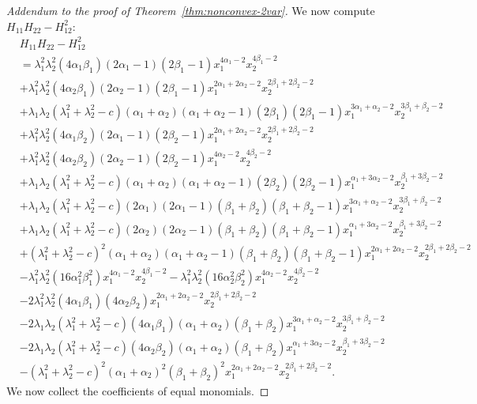 \documentclass[12pt]{elsarticle}
\theoremstyle{definition}
\begin{document}
\begin{proof}[Addendum to the proof of Theorem~\ref{thm:nonconvex-2var}]
We now compute $H_{11}H_{22} - H_{12}^2$:
\[
\begin{aligned}
   & H_{11}H_{22} - H_{12}^2  \\& =\lambda_1^2\lambda_2^2 (4\alpha_1\beta_1)(2\alpha_1 - 1)(2\beta_1 - 1)x_1^{4\alpha_1 - 2}x_2^{4\beta_1 - 2} \\
    & + \lambda_1^2\lambda_2^2 (4\alpha_2\beta_1)(2\alpha_2 - 1)(2\beta_1 - 1)x_1^{2\alpha_1 + 2\alpha_2 - 2}x_2^{2\beta_1 + 2\beta_2 - 2} \\
    & + \lambda_1\lambda_2(\lambda_1^2 + \lambda_2^2 - c)(\alpha_1 + \alpha_2)(\alpha_1 + \alpha_2 -1)(2\beta_1)(2\beta_1 - 1)x_1^{3\alpha_1 + \alpha_2 - 2}x_2^{3\beta_1 + \beta_2 - 2} \\
    & + \lambda_1^2\lambda_2^2 (4\alpha_1\beta_2)(2\alpha_1 - 1)(2\beta_2 - 1)x_1^{2\alpha_1 + 2\alpha_2 - 2}x_2^{2\beta_1 + 2\beta_2 - 2} \\
    & + \lambda_1^2\lambda_2^2 (4\alpha_2\beta_2)(2\alpha_2 - 1)(2\beta_2 - 1)x_1^{4\alpha_2 - 2}x_2^{4\beta_2 - 2} \\
    & + \lambda_1\lambda_2(\lambda_1^2 + \lambda_2^2 - c)(\alpha_1 + \alpha_2)(\alpha_1 + \alpha_2 -1)(2\beta_2)(2\beta_2 - 1)x_1^{\alpha_1 + 3\alpha_2 - 2}x_2^{\beta_1 + 3\beta_2 - 2} \\
    & + \lambda_1\lambda_2(\lambda_1^2 + \lambda_2^2 - c)(2\alpha_1)(2\alpha_1 - 1)(\beta_1 + \beta_2)(\beta_1 + \beta_2 - 1)x_1^{3\alpha_1 + \alpha_2 -2}x_2^{3\beta_1 + \beta_2 -2}\\
    & + \lambda_1\lambda_2(\lambda_1^2 + \lambda_2^2 - c)(2\alpha_2)(2\alpha_2 - 1)(\beta_1 + \beta_2)(\beta_1 + \beta_2 - 1)x_1^{\alpha_1 + 3\alpha_2 -2}x_2^{\beta_1 + 3\beta_2 -2}\\
    & + (\lambda_1^2 + \lambda_2^2 - c)^2 (\alpha_1 + \alpha_2)(\alpha_1 + \alpha_2 -1)(\beta_1 + \beta_2)(\beta_1 + \beta_2 - 1)x_1^{2\alpha_1 + 2\alpha_2 -2}x_2^{2\beta_1 + 2\beta_2 -2}\\
    & -\lambda_1^2\lambda_2^2 (16\alpha_1^2\beta_1^2)x_1^{4\alpha_1 -2}x_2^{4\beta_1 -2}  -\lambda_1^2\lambda_2^2 (16\alpha_2^2\beta_2^2)x_1^{4\alpha_2 -2}x_2^{4\beta_2 -2}\\
    & -2\lambda_1^2\lambda_2^2 (4\alpha_1\beta_1)(4\alpha_2\beta_2) x_1^{2\alpha_1 + 2\alpha_2 - 2}x_2^{2\beta_1 + 2\beta_2 - 2}\\
    & - 2\lambda_1\lambda_2(\lambda_1^2 + \lambda_2^2 - c)(4\alpha_1\beta_1)(\alpha_1 +\alpha_2)(\beta_1 + \beta_2)x_1^{3\alpha_1 + \alpha_2 -2}x_2^{3\beta_1 + \beta_2 - 2} \\
    & - 2\lambda_1\lambda_2(\lambda_1^2 + \lambda_2^2 - c)(4\alpha_2\beta_2)(\alpha_1 +\alpha_2)(\beta_1 + \beta_2)x_1^{\alpha_1 + 3\alpha_2 -2}x_2^{\beta_1 + 3\beta_2 - 2} \\
    & - (\lambda_1^2 + \lambda_2^2 - c)^2 (\alpha_1 +\alpha_2)^2 (\beta_1 + \beta_2)^2 x_1^{2\alpha_1 + 2\alpha_2 -2}x_2^{2\beta_1 + 2\beta_2 - 2}.
\end{aligned}
\]
We now collect the coefficients of equal monomials.


\end{proof}
\end{document}
